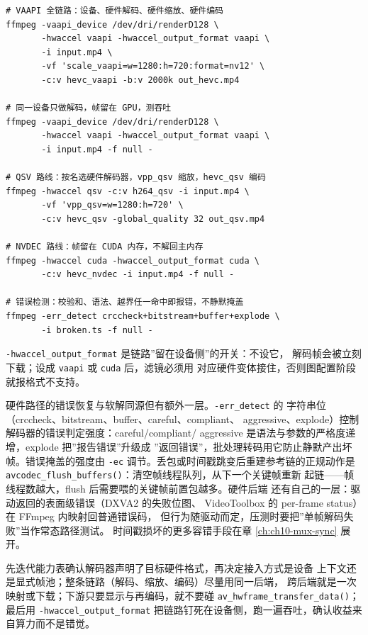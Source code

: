 \documentclass[12pt,a4paper,fontset=fandol]{ctexbook}
\newcommand{\Fn}[1]{\texttt{#1()}}
\newcommand{\Tp}[1]{\texttt{#1}}
\begin{document}
\begin{lstlisting}[style=shellstyle,
  caption={VAAPI/QSV/NVDEC 全链路命令与错误检测开关},
  label={lst:ch08-cli}]
# VAAPI 全链路：设备、硬件解码、硬件缩放、硬件编码
ffmpeg -vaapi_device /dev/dri/renderD128 \
       -hwaccel vaapi -hwaccel_output_format vaapi \
       -i input.mp4 \
       -vf 'scale_vaapi=w=1280:h=720:format=nv12' \
       -c:v hevc_vaapi -b:v 2000k out_hevc.mp4

# 同一设备只做解码，帧留在 GPU，测吞吐
ffmpeg -vaapi_device /dev/dri/renderD128 \
       -hwaccel vaapi -hwaccel_output_format vaapi \
       -i input.mp4 -f null -

# QSV 路线：按名选硬件解码器，vpp_qsv 缩放，hevc_qsv 编码
ffmpeg -hwaccel qsv -c:v h264_qsv -i input.mp4 \
       -vf 'vpp_qsv=w=1280:h=720' \
       -c:v hevc_qsv -global_quality 32 out_qsv.mp4

# NVDEC 路线：帧留在 CUDA 内存，不解回主内存
ffmpeg -hwaccel cuda -hwaccel_output_format cuda \
       -c:v hevc_nvdec -i input.mp4 -f null -

# 错误检测：校验和、语法、越界任一命中即报错，不静默掩盖
ffmpeg -err_detect crccheck+bitstream+buffer+explode \
       -i broken.ts -f null -
\end{lstlisting}

\Tp{-hwaccel\_output\_format} 是链路''留在设备侧''的开关：不设它，
解码帧会被立刻下载；设成 \Tp{vaapi} 或 \Tp{cuda} 后，滤镜必须用
对应硬件变体接住，否则图配置阶段就报格式不支持。

硬件路径的错误恢复与软解同源但有额外一层。\Tp{-err\_detect} 的
字符串位（crccheck、bitstream、buffer、careful、compliant、
aggressive、explode）控制解码器的错误判定强度：careful/compliant/
aggressive 是语法与参数的严格度递增，explode 把''报告错误''升级成
''返回错误''，批处理转码用它防止静默产出坏帧。错误掩盖的强度由
\Tp{-ec} 调节。丢包或时间戳跳变后重建参考链的正规动作是
\Fn{avcodec\_flush\_buffers}：清空帧线程队列，从下一个关键帧重新
起链——帧线程数越大，flush 后需要喂的关键帧前置包越多。硬件后端
还有自己的一层：驱动返回的表面级错误（DXVA2 的失败位图、
VideoToolbox 的 per-frame status）在 FFmpeg 内映射回普通错误码，
但行为随驱动而定，压测时要把''单帧解码失败''当作常态路径测试。
时间戳损坏的更多容错手段在章 \ref{ch:ch10-mux-sync} 展开。

\begin{bestpractice}[title={硬件加速路径选型清单}]
  先迭代能力表确认解码器声明了目标硬件格式，再决定接入方式是设备
  上下文还是显式帧池；整条链路（解码、缩放、编码）尽量用同一后端，
  跨后端就是一次映射或下载；下游只要显示与再编码，就不要碰
  \Fn{av\_hwframe\_transfer\_data}；最后用 \Tp{-hwaccel\_output\_format}
  把链路钉死在设备侧，跑一遍吞吐，确认收益来自算力而不是错觉。
\end{bestpractice}
\end{document}
